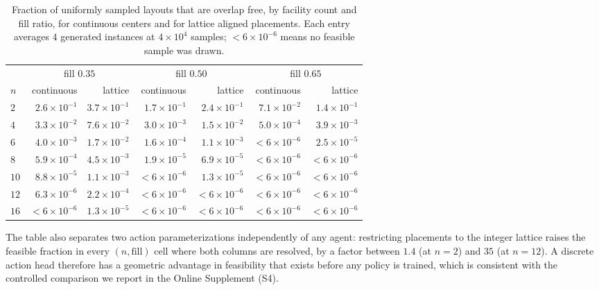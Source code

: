 \documentclass[preprint,12pt,authoryear]{elsarticle}
\begin{document}
\begin{table}[t]
\centering
\caption{Fraction of uniformly sampled layouts that are overlap free, by
facility count and fill ratio, for continuous centers and for lattice aligned
placements. Each entry averages $4$ generated instances at $4\times10^4$ samples;
$<\!6\times10^{-6}$ means no feasible sample was drawn.}
\label{tab:feasvol}
\small
\setlength{\tabcolsep}{4pt}
\begin{tabular}{@{}lrrrrrr@{}}
\toprule
 & \multicolumn{2}{c}{fill $0.35$} & \multicolumn{2}{c}{fill $0.50$}
 & \multicolumn{2}{c}{fill $0.65$} \\
\cmidrule(lr){2-3}\cmidrule(lr){4-5}\cmidrule(lr){6-7}
$n$ & continuous & lattice & continuous & lattice & continuous & lattice \\
\midrule
$2$  & $2.6{\times}10^{-1}$ & $3.7{\times}10^{-1}$ & $1.7{\times}10^{-1}$ & $2.4{\times}10^{-1}$ & $7.1{\times}10^{-2}$ & $1.4{\times}10^{-1}$ \\
$4$  & $3.3{\times}10^{-2}$ & $7.6{\times}10^{-2}$ & $3.0{\times}10^{-3}$ & $1.5{\times}10^{-2}$ & $5.0{\times}10^{-4}$ & $3.9{\times}10^{-3}$ \\
$6$  & $4.0{\times}10^{-3}$ & $1.7{\times}10^{-2}$ & $1.6{\times}10^{-4}$ & $1.1{\times}10^{-3}$ & $<6{\times}10^{-6}$ & $2.5{\times}10^{-5}$ \\
$8$  & $5.9{\times}10^{-4}$ & $4.5{\times}10^{-3}$ & $1.9{\times}10^{-5}$ & $6.9{\times}10^{-5}$ & $<6{\times}10^{-6}$ & $<6{\times}10^{-6}$ \\
$10$ & $8.8{\times}10^{-5}$ & $1.1{\times}10^{-3}$ & $<6{\times}10^{-6}$ & $1.3{\times}10^{-5}$ & $<6{\times}10^{-6}$ & $<6{\times}10^{-6}$ \\
$12$ & $6.3{\times}10^{-6}$ & $2.2{\times}10^{-4}$ & $<6{\times}10^{-6}$ & $<6{\times}10^{-6}$ & $<6{\times}10^{-6}$ & $<6{\times}10^{-6}$ \\
$16$ & $<6{\times}10^{-6}$ & $1.3{\times}10^{-5}$ & $<6{\times}10^{-6}$ & $<6{\times}10^{-6}$ & $<6{\times}10^{-6}$ & $<6{\times}10^{-6}$ \\
\bottomrule
\end{tabular}
\end{table}

The table also separates two action parameterizations independently of any agent:
restricting placements to the integer lattice raises the feasible fraction in
every $(n,\text{fill})$ cell where both columns are resolved, by a factor
between $1.4$ (at $n=2$) and $35$ (at $n=12$). A discrete action head
therefore has a geometric advantage in feasibility that exists before any policy
is trained, which is consistent with the controlled comparison we report in the
Online Supplement (S4).
\end{document}

